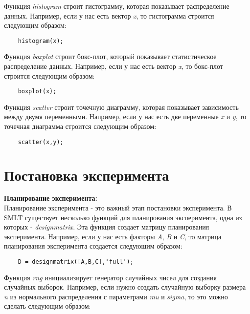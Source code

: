 \documentclass[a4paper, 12pt]{article}%
\begin{document}
\begin{titlepage}
	Функция \textit{histogram} строит гистограмму, которая показывает распределение данных. Например, если у нас есть вектор \textit{x}, то гистограмма строится следующим образом:\\
	
	\begin{lstlisting}
	histogram(x);
	\end{lstlisting}
	
	Функция \textit{boxplot} строит бокс-плот, который показывает статистическое распределение данных. Например, если у нас есть вектор \textit{x}, то бокс-плот строится следующим образом:\\
	
	\begin{lstlisting}
	boxplot(x);
	\end{lstlisting}
	
	Функция \textit{scatter} строит точечную диаграмму, которая показывает зависимость между двумя переменными. Например, если у нас есть две переменные \textit{x} и \textit{y}, то точечная диаграмма строится следующим образом:\\
	
	\begin{lstlisting}
	scatter(x,y);
	\end{lstlisting}
	
	\section{Постановка эксперимента}
	
	\hspace{\parindent}\textbf{Планирование эксперимента:}\\
	Планирование эксперимента - это важный этап постановки эксперимента. В SMLT существует несколько функций для планирования эксперимента, одна из которых - \textit{designmatrix}. Эта функция создает матрицу планирования эксперимента. Например, если у нас есть факторы \textit{A}, \textit{B} и \textit{C}, то матрица планирования эксперимента создается следующим образом:\\
	
	\begin{lstlisting}
	D = designmatrix([A,B,C],'full');
	\end{lstlisting}
	
	Функция \textit{rng} инициализирует генератор случайных чисел для создания случайных выборок. Например, если нужно создать случайную выборку размера \textit{n} из нормального распределения с параметрами \textit{mu} и \textit{sigma}, то это можно сделать следующим образом:\\
	

\end{titlepage}
\end{document}
